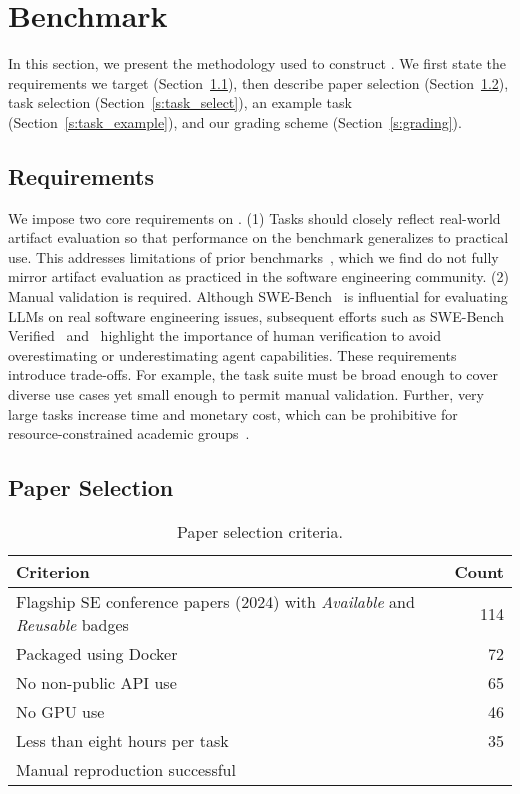 \section{Benchmark}
\label{s:benchmark}

In this section, we present the methodology used to construct \benchmark.
We first state the requirements we target (Section~\ref{s:requirements}), then describe paper selection (Section~\ref{s:paper_select}), task selection (Section~\ref{s:task_select}), an example task (Section~\ref{s:task_example}), and our grading scheme (Section~\ref{s:grading}).

\subsection{Requirements}
\label{s:requirements}

We impose two core requirements on \benchmark.
(1) Tasks should closely reflect real-world artifact evaluation so that performance on the benchmark generalizes to practical use.
This addresses limitations of prior benchmarks~\cite{DBLP:conf/emnlp/BoginYG0BCSK24,DBLP:journals/tmlr/SiegelKNSN24,DBLP:conf/acl/HuZLWPK25}, which we find do not fully mirror artifact evaluation as practiced in the software engineering community.
(2) Manual validation is required.
Although SWE-Bench~\cite{jimenez2024swebench} is influential for evaluating LLMs on real software engineering issues, subsequent efforts such as SWE-Bench Verified~\cite{chowdhury2024swebenchverified} and~\cite{DBLP:journals/corr/abs-2503-15223} highlight the importance of human verification to avoid overestimating or underestimating agent capabilities.
These requirements introduce trade-offs.
For example, the task suite must be broad enough to cover diverse use cases yet small enough to permit manual validation.
Further, very large tasks increase time and monetary cost, which can be prohibitive for resource-constrained academic groups~\cite{DBLP:conf/iclr/ChanCJASMSLMPMW25}.

\subsection{Paper Selection}
\label{s:paper_select}

\begin{table}[t]
  \caption{Paper selection criteria.}
  \label{t:paper_select}
  \centering
  \begin{tabular}{@{}l r@{}}
    \toprule
    Criterion & Count \\
    \midrule
    Flagship SE conference papers (2024) with \emph{Available} and \emph{Reusable} badges & 114 \\
    Packaged using Docker & 72 \\
    No non-public API use & 65 \\
    No GPU use & 46 \\
    Less than eight hours per task & 35 \\
    Manual reproduction successful & \papersetsize \\
    \bottomrule
  \end{tabular}
\end{table}

